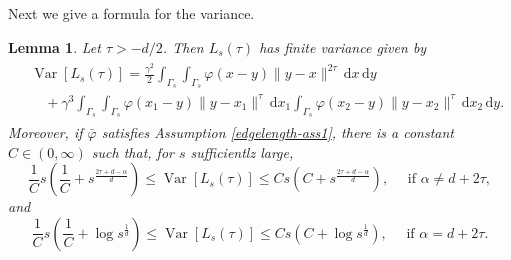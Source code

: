 \documentclass{article}
\newtheorem{lemma}[theorem]{Lemma}
\theoremstyle{definition}
\numberwithin{equation}{section}
\theoremstyle{remark}
\begin{document}
Next we give a formula for the variance.

\begin{lemma} \label{lem:varlength}
    Let $\tau > -d/2$. Then $L_s (\tau)$ has finite variance given by
    \begin{align}\label{varformula}
    \begin{split}
        & \operatorname{Var}[L_s (\tau)] = \frac{\gamma^2}{2} \int_{\Gamma_s}\int_{\Gamma_s} \varphi(x-y) \| y-x \|^{2\tau} \, \mathrm{d}x \, \mathrm{d}y  \\
        & \quad + \gamma^3\int_{\Gamma_s}\int_{\Gamma_s} \varphi(x_1-y) \| y-x_1 \|^\tau \, \mathrm{d} x_1 \int_{\Gamma_s} \varphi(x_2-y)  \| y-x_2 \|^\tau \, \mathrm{d} x_2 \, \mathrm{d} y.
    \end{split} 
    \end{align}
Moreover, if $\bar{\varphi}$ satisfies Assumption \ref{edgelength-ass1}, there is a constant $C \in (0, \infty)$ such that, for $s$ sufficientlz large,
$$ \frac{1}{C} s \left( \frac{1}{C} + s^{\frac{2\tau + d -\alpha}{d}} \right) \leq \operatorname{Var}[L_s (\tau)] \leq Cs\left( {C} + s^{\frac{2\tau + d -\alpha}{d}} \right), \quad \text{ if } \alpha \neq d+2\tau,$$
and
$$ \frac{1}{C} s \left( \frac{1}{C} + \log s^{\frac{1}{d}} \right) \leq \operatorname{Var}[L_s (\tau)] \leq  Cs ( C +\log s^{\frac{1}{d}}), \quad \text{ if } \alpha = d+2\tau.$$
\end{lemma}
\end{document}
